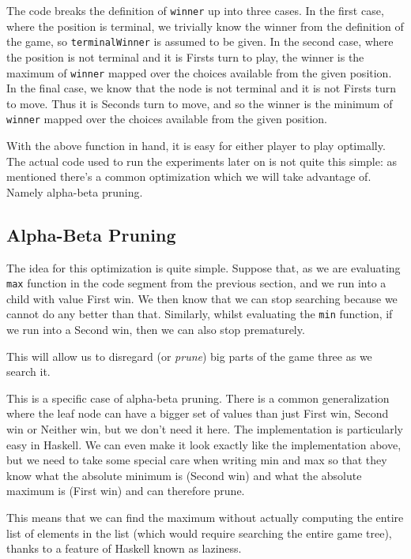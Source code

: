 The code breaks the definition of \texttt{winner} up into three cases.
In the first case, where the position is terminal, we trivially know the winner from the definition of the game, so \texttt{terminalWinner} is assumed to be given.
In the second case, where the position is not terminal and it is Firsts turn to play, the winner is the maximum of \texttt{winner} mapped over the choices available from the given position.
In the final case, we know that the node is not terminal and it is not Firsts turn to move. Thus it is Seconds turn to move, and so the winner is the minimum of \texttt{winner} mapped over the choices available from the given position.

With the above function in hand, it is easy for either player to play optimally.
The actual code used to run the experiments later on is not quite this simple: as mentioned there's a common optimization which we will take advantage of.
Namely alpha-beta pruning.

\subsection {Alpha-Beta Pruning}

The idea for this optimization is quite simple.
Suppose that, as we are evaluating \texttt{max} function in the code segment from the previous section, and we run into a child with value First win.
We then know that we can stop searching because we cannot do any better than that.
Similarly, whilst evaluating the \texttt{min} function, if we run into a Second win, then we can also stop prematurely.

This will allow us to disregard (or \emph{prune}) big parts of the game three as we search it.


This is a specific case of alpha-beta pruning.
There is a common generalization where the leaf node can have a bigger set of values than just First win, Second win or Neither win, but we don't need it here.
The implementation is particularly easy in Haskell. We can even make it look exactly like the implementation above, but we need to take some special care when writing min and max so that they know what the absolute minimum is (Second win) and what the absolute maximum is (First win) and can therefore prune.

This means that we can find the maximum without actually computing the entire list of elements in the list (which would require searching the entire game tree), thanks to a feature of Haskell known as laziness.

